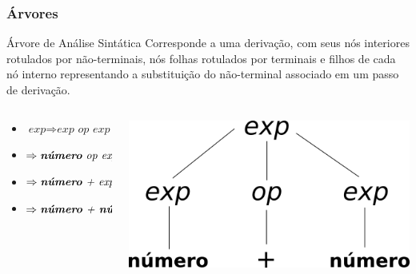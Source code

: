 \documentclass[table]{beamer}
\begin{document}
\begin{frame}
   \frametitle{Árvores}
   \begin{block}{Árvore de Análise Sintática}
   Corresponde a uma derivação, com seus nós interiores rotulados por não-terminais, nós folhas rotulados por terminais e filhos de cada nó interno representando a substituição do não-terminal associado em um passo de derivação.
   \end{block}
   \hspace{1.0cm}
   \begin{columns}
   \begin{column}{0.5\textwidth}
   \begin{itemize} 
      \item[] $\textit{exp} \Rightarrow \textit{exp op exp}$
      \item[] \hspace{0.5cm} $\Rightarrow \textit{\textbf{número} op exp}$
      \item[] \hspace{0.5cm} $\Rightarrow \textit{\textbf{número} + exp}$
      \item[] \hspace{0.5cm} $\Rightarrow \textit{\textbf{número} + \textbf{número}}$
   \end{itemize}
   \end{column}
   \begin{column}{0.5\textwidth}
   \includegraphics[width=\linewidth,height=\textheight,keepaspectratio]{figuras/primeira_arvore.png}
   \end{column}
   \end{columns}
\end{frame}
\end{document}
